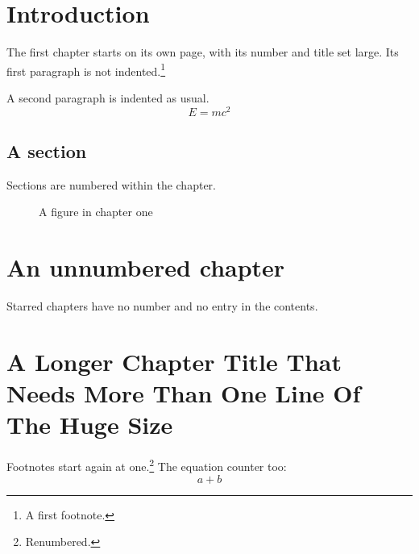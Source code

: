 \documentclass{report}
\begin{document}
\chapter{Introduction}
The first chapter starts on its own page, with its number and title set large. Its first paragraph is not indented.\footnote{A first footnote.}

A second paragraph is indented as usual. \begin{equation} E=mc^2 \end{equation}
\section{A section}
Sections are numbered within the chapter.

\begin{figure}[h]
\centering
\caption{A figure in chapter one}
\end{figure}

\chapter*{An unnumbered chapter}
Starred chapters have no number and no entry in the contents.

\chapter{A Longer Chapter Title That Needs More Than One Line Of The Huge Size}
Footnotes start again at one.\footnote{Renumbered.} The equation counter too: \begin{equation} a+b \end{equation}
\end{document}
